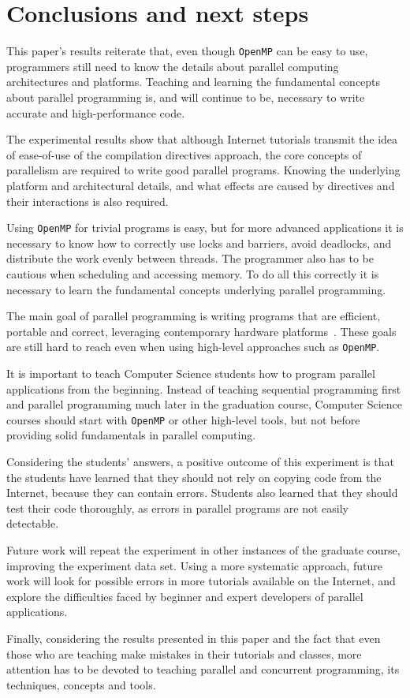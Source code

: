 \section{Conclusions and next steps}
\label{sec:conclusions}

This paper's results reiterate that, even though \texttt{OpenMP} can be easy to use, programmers still need to know the details about parallel computing architectures and platforms. Teaching and learning the fundamental concepts about parallel programming is, and will continue to be, necessary to write accurate and high-performance code.

The experimental results show that although Internet tutorials transmit the idea of ease-of-use of the compilation directives approach, the core concepts of parallelism are required to write good parallel programs. Knowing the underlying platform and architectural details, and what effects are caused by directives and their interactions is also required.

Using \texttt{OpenMP} for trivial programs is easy, but for more advanced applications it is necessary to know how to correctly use locks and barriers, avoid deadlocks, and distribute the work evenly between threads. The programmer also has to be cautious when scheduling and accessing memory. To do all this correctly it is necessary to learn the fundamental concepts underlying parallel programming.

The main goal of parallel programming is writing programs that are efficient, portable and correct, leveraging contemporary hardware platforms~\cite{Asanovic2009}. These goals are still hard to reach even when using high-level approaches such as \texttt{OpenMP}.

It is important to teach Computer Science students how to program parallel applications from the beginning. Instead of teaching sequential programming first and parallel programming much later in the graduation course, Computer Science courses should start with \texttt{OpenMP} or other high-level tools, but not before providing solid fundamentals in parallel computing.

Considering the students' answers, a positive outcome of this experiment is that the students have learned that they should not rely on copying code from the Internet, because they can contain errors. Students also learned that they should test their code thoroughly, as errors in parallel programs are not easily detectable.

Future work will repeat the experiment in other instances of the graduate course, improving the experiment data set. Using a more systematic approach, future work will look for possible errors in more tutorials available on the Internet, and explore the difficulties faced by beginner and expert developers of parallel applications.

Finally, considering the results presented in this paper and the fact that even those who are teaching make mistakes in their tutorials and classes, more attention has to be devoted to teaching parallel and concurrent programming, its techniques, concepts and tools.